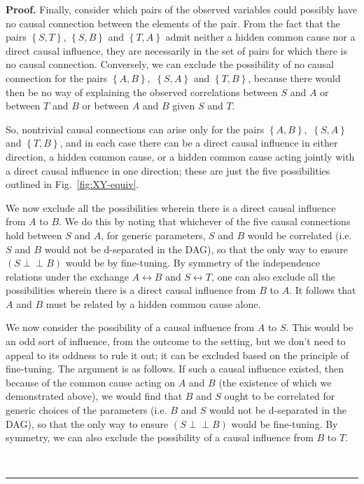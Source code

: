 \documentclass[12pt,onecolumn,nofootinbib]{revtex4-2}
\newenvironment{proof}[1][Proof]{\noindent\textbf{#1.} }{\ \rule{0.5em}{0.5em}}
\def\indep{\perp\!\!\!\!\perp}
\begin{document}
\begin{proof}
Finally, consider which pairs of the observed variables could possibly have no causal connection between the elements of the pair. From the fact that the pairs $\left\{S,T\right\}$, $\left\{S,B\right\}$ and $\left\{T,A\right\}$ admit neither a hidden common cause nor a direct causal influence, they are necessarily in the set of pairs for which there is no causal connection.   Conversely, we can exclude the possibility of no causal connection for the pairs $\left\{A,B\right\},$ $\left\{  S,A\right\}  $ and $\left\{  T,B\right\}$, because there would then be no way of explaining the observed correlations between $S$ and $A$ or between $T$ and $B$ or between $A$ and $B$ given $S$ and $T.$

So, nontrivial causal connections can arise only for the pairs $\left\{A,B\right\},$ $\left\{  S,A\right\}  $ and $\left\{  T,B\right\}$, and in each case there can be a direct causal influence in either direction, a hidden common cause, or a hidden common cause acting jointly with a direct causal influence in one direction; these are just the five possibilities outlined in Fig.~\ref{fig:XY-equiv}.

We now exclude all the possibilities wherein there is a direct causal influence from $A$ to $B$.  We do this by noting that whichever of the five causal connections hold between $S$ and $A$, for generic parameters, $S$ and $B$ would be correlated (i.e. $S$ and $B$ would not be d-separated in the DAG), so that the only way to ensure $\left(S \indep B\right)$ would be by fine-tuning.  By symmetry of the independence relations under the exchange $A \leftrightarrow B$ and $S \leftrightarrow T$, one can also exclude all the possibilities wherein there is a direct causal influence from $B$ to $A$.  It follows that $A$ and $B$ must be related by a hidden common cause alone. 

We now consider the possibility of a causal influence from $A$ to $S$.  This would be an odd sort of influence, from the outcome to the setting, but we don't need to appeal to its oddness to rule it out; it can be excluded based on the principle of fine-tuning. The argument is as follows.  If such a causal influence existed, then because of the common cause acting on $A$ and $B$ (the existence of which we demonstrated above), we would find that $B$ and $S$ ought to be correlated for generic choices of the parameters (i.e. $B$ and $S$ would not be d-separated in the DAG), so that the only way to ensure $\left(S \indep B\right)$ would be fine-tuning.  By symmetry, we can also exclude the possibility of a causal influence from $B$ to $T$. 


\end{proof}
\end{document}

